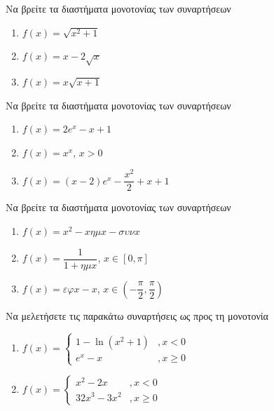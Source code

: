 \documentclass{presentation}
\begin{document}
\begin{askisi}
  Να βρείτε τα διαστήματα μονοτονίας των συναρτήσεων
  \begin{enumerate}
    \item<1-> $f(x)=\sqrt{x^2+1}$
    \item<2-> $f(x)=x-2\sqrt{x}$
    \item<3-> $f(x)=x\sqrt{x+1}$
  \end{enumerate}

\end{askisi}

\begin{askisi}
  Να βρείτε τα διαστήματα μονοτονίας των συναρτήσεων
  \begin{enumerate}
    \item<1-> $f(x)=2e^x-x+1$
    \item<2-> $f(x)=x^x$, $x>0$
    \item<3-> $f(x)=(x-2)e^x-\dfrac{x^2}{2}+x+1$
  \end{enumerate}

\end{askisi}

\begin{askisi}
  Να βρείτε τα διαστήματα μονοτονίας των συναρτήσεων
  \begin{enumerate}
    \item<1-> $f(x)=x^2-xημx-συνx$
    \item<2-> $f(x)=\dfrac{1}{1+ημx}$, $x\in [0,\pi]$
    \item<3-> $f(x)=εφx-x$, $x\in \left( -\dfrac{\pi}{2},\dfrac{\pi}{2} \right) $
  \end{enumerate}

\end{askisi}

\begin{askisi}
  Να μελετήσετε τις παρακάτω συναρτήσεις ως προς τη μονοτονία
  \begin{enumerate}
    \item<1-> $f(x)=\begin{cases}
              1-\ln (x^2+1) & ,x<0    \\
              e^x-x         & ,x\ge 0
            \end{cases}$
    \item<2-> $f(x)=\begin{cases}
              x^2-2x     & ,x<0    \\
              32x^3-3x^2 & ,x\ge 0
            \end{cases}$
  \end{enumerate}

\end{askisi}
\end{document}
